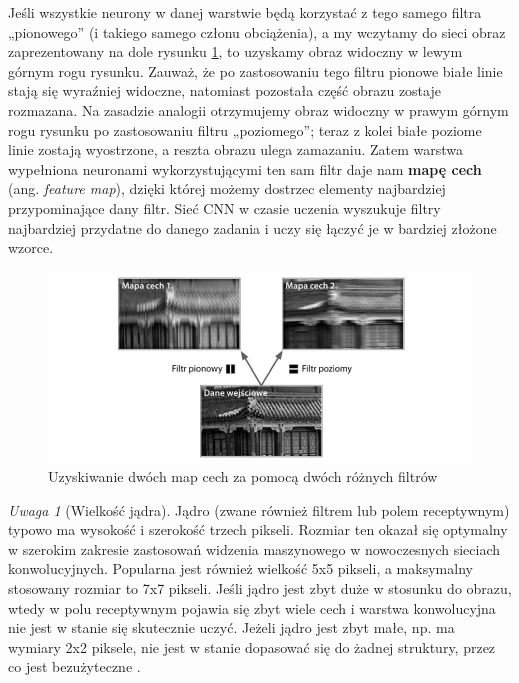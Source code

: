 \documentclass[12pt]{mwbk}
\theoremstyle{plain}
\theoremstyle{definition}
\theoremstyle{remark}
\newtheorem{uwaga}{Uwaga}[chapter]
\newcommand\zrodlo[1]{\par\vspace{-3mm}{\small\textit{Źródło: }#1 }}
\begin{document}
Jeśli wszystkie neurony w danej warstwie będą korzystać z tego samego filtra „pionowego” (i takiego
samego członu obciążenia), a my wczytamy do sieci obraz zaprezentowany na dole rysunku \ref{fig:filtry},
to uzyskamy obraz widoczny w lewym górnym rogu rysunku. Zauważ, że po zastosowaniu tego filtru
pionowe białe linie stają się wyraźniej widoczne, natomiast pozostała część obrazu zostaje rozmazana.
Na zasadzie analogii otrzymujemy obraz widoczny w prawym górnym rogu rysunku po zastosowaniu filtru „poziomego”; teraz z kolei białe poziome linie zostają wyostrzone, a reszta obrazu ulega zamazaniu. Zatem warstwa wypełniona neuronami wykorzystującymi ten sam filtr daje nam \textbf{mapę cech} (ang. \emph{feature map}), dzięki której możemy dostrzec elementy najbardziej przypominające dany filtr. Sieć CNN w czasie uczenia wyszukuje filtry najbardziej przydatne do danego zadania i uczy się łączyć je w bardziej złożone wzorce.

\begin{figure}[!h]
	\centering
	\includegraphics[width=0.9\linewidth]{rys/cnn_filtry.png}
	\caption{Uzyskiwanie dwóch map cech za pomocą dwóch różnych filtrów}
	\zrodlo{\cite{geron}}
	\label{fig:filtry}
\end{figure}

\begin{uwaga}[Wielkość jądra]
	Jądro (zwane również filtrem lub polem receptywnym) typowo ma wysokość i szerokość trzech pikseli. Rozmiar ten okazał się optymalny w szerokim zakresie zastosowań widzenia maszynowego w nowoczesnych sieciach konwolucyjnych. Popularna jest również wielkość 5x5 pikseli, a maksymalny stosowany rozmiar to 7x7 pikseli. Jeśli jądro jest zbyt duże w stosunku do obrazu, wtedy w polu receptywnym pojawia się zbyt wiele cech i warstwa konwolucyjna nie jest w stanie się skutecznie uczyć. Jeżeli jądro jest zbyt małe, np. ma wymiary 2x2 piksele, nie jest w stanie dopasować się do żadnej struktury, przez co jest bezużyteczne \cite{illustrated}.
\end{uwaga}
\end{document}

